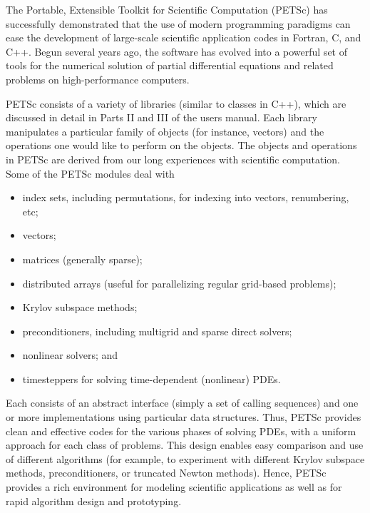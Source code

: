 
%
%
%

\label{sec_gettingstarted}

The Portable, Extensible Toolkit for Scientific Computation (PETSc)
has successfully demonstrated that the use of modern programming
paradigms can ease the development of large-scale scientific
application codes in Fortran, C, and C++.  Begun several years ago,
the software has evolved into a powerful set of tools for the
numerical solution of partial differential equations and related problems 
on high-performance computers.

PETSc consists of a variety of libraries (similar to classes in C++),
which are discussed in detail in Parts II and III of the users manual.
Each library manipulates a particular family of objects (for instance,
vectors) and the operations one would like to perform on the objects.
The objects and operations in PETSc are derived from our long 
experiences with scientific computation. Some of the PETSc modules deal with 
\begin{itemize} 
\item index sets, including permutations, for indexing into vectors, renumbering, etc;
\item vectors;
\item matrices (generally sparse);
\item distributed arrays (useful for parallelizing regular grid-based 
      problems);
\item Krylov subspace methods;
\item preconditioners, including multigrid and sparse direct solvers;
\item nonlinear solvers; and
\item timesteppers for solving time-dependent (nonlinear) PDEs.
\end{itemize}
Each consists of an abstract interface 
(simply a set of calling sequences) and one or more implementations 
using particular data structures. Thus, PETSc provides clean and 
effective codes for the various phases of solving PDEs, with a uniform 
approach for each class of problems.  This design
enables easy comparison and use of different algorithms (for example,
to experiment with different Krylov subspace methods, preconditioners,
or truncated Newton methods).
Hence, PETSc provides a rich environment for modeling scientific
applications as well as for rapid algorithm design and prototyping.

